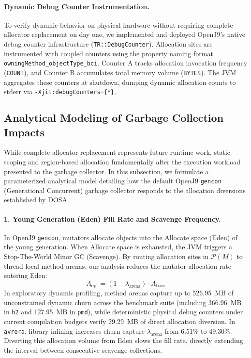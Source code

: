 \documentclass[12pt,a4paper]{article}
\begin{document}
\paragraph{Dynamic Debug Counter Instrumentation.}
To verify dynamic behavior on physical hardware without requiring complete allocator replacement on day one, we implemented and deployed OpenJ9's native debug counter infrastructure (\texttt{TR::DebugCounter}). Allocation sites are instrumented with coupled counters using the property naming format \texttt{owningMethod\_objectType\_bci}. Counter A tracks allocation invocation frequency (\texttt{COUNT}), and Counter B accumulates total memory volume (\texttt{BYTES}). The JVM aggregates these counters at shutdown, dumping dynamic allocation counts to stderr via \lstinline|-Xjit:debugCounters={*}|.

\subsection{Analytical Modeling of Garbage Collection Impacts}
\label{sec:gc-impacts}

While complete allocator replacement represents future runtime work, static scoping and region-based allocation fundamentally alter the execution workload presented to the garbage collector. In this subsection, we formulate a parameterized analytical model detailing how the default OpenJ9 \texttt{gencon} (Generational Concurrent) garbage collector responds to the allocation diversions established by DOSA.

\paragraph{1. Young Generation (Eden) Fill Rate and Scavenge Frequency.}
In OpenJ9 \texttt{gencon}, mutators allocate objects into the Allocate space (Eden) of the young generation. When Allocate space is exhausted, the JVM triggers a Stop-The-World Minor GC (Scavenge). By routing allocation sites in $\mathcal{P}(M)$ to thread-local method arenas, our analysis reduces the mutator allocation rate entering Eden:
\begin{equation}
A_{\text{opt}} = (1 - \lambda_{\text{arena}}) \cdot A_{\text{base}}
\end{equation}
In exploratory dynamic profiling, method arenas capture up to 526.95~MB of unconstrained dynamic churn across the benchmark suite (including 366.96~MB in \texttt{h2} and 127.95~MB in \texttt{pmd}), while deterministic physical debug counters under current compilation budgets verify 29.29~MB of direct allocation diversion. In \texttt{avrora}, library inlining increases churn capture $\lambda_{\text{arena}}$ from 6.51\% to 49.30\%. Diverting this allocation volume from Eden slows the fill rate, directly extending the interval between consecutive scavenge collections.
\end{document}
